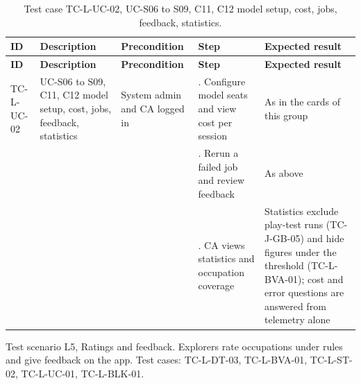 {\small
\begin{longtable}{|>{\raggedright\arraybackslash}p{}|>{\raggedright\arraybackslash}p{}|>{\raggedright\arraybackslash}p{}|>{\raggedright\arraybackslash}p{}|>{\raggedright\arraybackslash}p{}|}
\caption{Test case TC-L-UC-02, UC-S06 to S09, C11, C12 model setup, cost, jobs, feedback, statistics.} \\
\hline
\textbf{ID} & \textbf{Description} & \textbf{Precondition} & \textbf{Step} & \textbf{Expected result} \\ \hline
\endfirsthead
\hline
\textbf{ID} & \textbf{Description} & \textbf{Precondition} & \textbf{Step} & \textbf{Expected result} \\ \hline
\endhead
TC-L-UC-02 & UC-S06 to S09, C11, C12 model setup, cost, jobs, feedback, statistics & System admin and CA logged in & 1. Configure model seats and view cost per session & As in the cards of this group \\ \hline
 &  &  & 2. Rerun a failed job and review feedback & As above \\ \hline
 &  &  & 3. CA views statistics and occupation coverage & Statistics exclude play-test runs (TC-J-GB-05) and hide figures under the threshold (TC-L-BVA-01); cost and error questions are answered from telemetry alone \\ \hline
\end{longtable}
}

Test scenario L5, Ratings and feedback. Explorers rate occupations under rules and give feedback on the app. Test cases: TC-L-DT-03, TC-L-BVA-01, TC-L-ST-02, TC-L-UC-01, TC-L-BLK-01.

